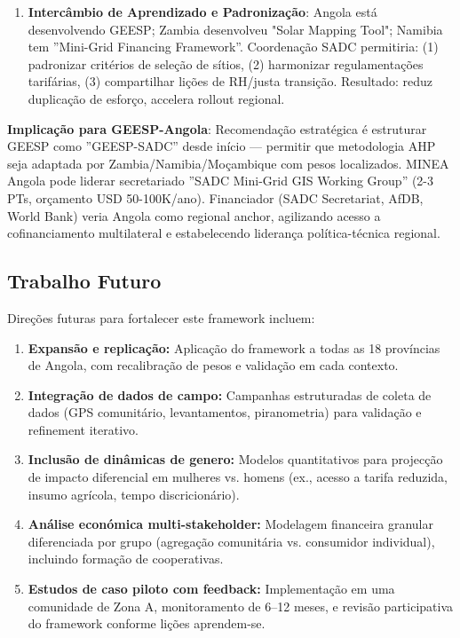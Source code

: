 \documentclass[12pt, a4paper]{article}
\begin{document}
{{{{{{{{{{{{\begin{enumerate}
\item \textbf{Intercâmbio de Aprendizado e Padronização}: Angola está desenvolvendo GEESP; Zambia desenvolveu "Solar Mapping Tool"; Namibia tem ''Mini-Grid Financing Framework''. Coordenação SADC permitiria: (1) padronizar critérios de seleção de sítios, (2) harmonizar regulamentações tarifárias, (3) compartilhar lições de RH/justa transição. Resultado: reduz duplicação de esforço, accelera rollout regional.
\end{enumerate}

\textbf{Implicação para GEESP-Angola}: Recomendação estratégica é estruturar GEESP como ''GEESP-SADC'' desde início — permitir que metodologia AHP seja adaptada por Zambia/Namibia/Moçambique com pesos localizados. MINEA Angola pode liderar secretariado ''SADC Mini-Grid GIS Working Group'' (2-3 PTs, orçamento USD 50-100K/ano). Financiador (SADC Secretariat, AfDB, World Bank) veria Angola como regional anchor, agilizando acesso a cofinanciamento multilateral e estabelecendo liderança política-técnica regional.

\subsection{Trabalho Futuro}

Direções futuras para fortalecer este framework incluem:

\begin{enumerate}

\item \textbf{Expansão e replicação:} Aplicação do framework a todas as 18 províncias de Angola, com recalibração de pesos e validação em cada contexto.

\item \textbf{Integração de dados de campo:} Campanhas estruturadas de coleta de dados (GPS comunitário, levantamentos, piranometria) para validação e refinement iterativo.

\item \textbf{Inclusão de dinâmicas de genero:} Modelos quantitativos para projecção de impacto diferencial em mulheres vs. homens (ex., acesso a tarifa reduzida, insumo agrícola, tempo discricionário).

\item \textbf{Análise económica multi-stakeholder:} Modelagem financeira granular diferenciada por grupo (agregação comunitária vs. consumidor individual), incluindo formação de cooperativas.

\item \textbf{Estudos de caso piloto com feedback:} Implementação em uma comunidade de Zona A, monitoramento de 6--12 meses, e revisão participativa do framework conforme lições aprendem-se.


\end{enumerate}}}}}}}}}}}}}
\end{document}
